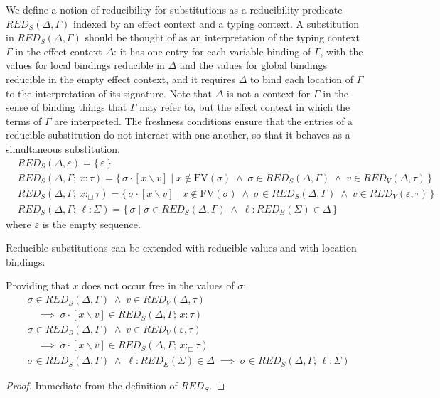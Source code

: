 \documentclass[acmsmall, screen, review, anonymous]{acmart}
\theoremstyle{definition}
\newcommand{\loc}{\ell}
\newcommand{\types}{\mathrel{:}}
\newcommand{\gtypes}{\mathrel{:_{\Box}}}
\newcommand{\cempty}{\varepsilon}
\newcommand{\ccons}[2]{#1;\,#2}
\newcommand{\lbind}[3]{\ccons{#1}{#2\types#3}}
\newcommand{\gbind}[3]{\ccons{#1}{#2\gtypes#3}}
\newcommand{\sub}[2]{[#1\backslash#2]}
\newcommand{\fv}[1]{\mathrm{FV}(#1)}
\newcommand{\redname}{RED}
\newcommand{\redvname}{\redname_{V}}
\newcommand{\redv}[2]{\redvname{({#1},{#2})}}
\newcommand{\redsname}{\redname_{S}}
\newcommand{\reds}[2]{\redsname{({#1},{#2})}}
\newcommand{\redsigname}{\redname_{E}}
\newcommand{\redsig}[1]{\redsigname{(#1)}}
\begin{document}
We define a notion of reducibility for substitutions as a reducibility
predicate $\reds{\Delta}{\Gamma}$ indexed by an effect context and a
typing context. A substitution in $\reds{\Delta}{\Gamma}$ should be
thought of as an interpretation of the typing context $\Gamma$
in the effect context $\Delta$: it has one entry for each variable
binding of $\Gamma$, with the values for local bindings reducible in
$\Delta$ and the values for global bindings reducible in the empty
effect context, and it requires $\Delta$ to bind each location of
$\Gamma$ to the interpretation of its signature. Note that $\Delta$ is
not a context for $\Gamma$ in the sense of binding things that
$\Gamma$ may refer to, but the effect context in which the terms of
$\Gamma$ are interpreted. The freshness conditions ensure that the
entries of a reducible substitution do not interact with one another,
so that it behaves as a simultaneous substitution.
\begin{align*}
  &\reds{\Delta}{\cempty} =
    \{ \, \cempty \, \} \\
  &\reds{\Delta}{\lbind{\Gamma}{x}{\tau}} =
    \{ \, \sigma \cdot \sub{x}{v} \; | \;
       x \notin \fv{\sigma}
       \; \wedge \; \sigma \in \reds{\Delta}{\Gamma}
       \; \wedge \; v \in \redv{\Delta}{\tau} \, \} \\
  &\reds{\Delta}{\gbind{\Gamma}{x}{\tau}} =
    \{ \, \sigma \cdot \sub{x}{v} \; | \;
       x \notin \fv{\sigma}
       \; \wedge \; \sigma \in \reds{\Delta}{\Gamma}
       \; \wedge \; v \in \redv{\cempty}{\tau} \, \} \\
  &\reds{\Delta}{\lbind{\Gamma}{\loc}{\Sigma}} =
    \{ \, \sigma \; | \;
       \sigma \in \reds{\Delta}{\Gamma}
       \; \wedge \; \loc \types \redsig{\Sigma} \in \Delta \, \}
\end{align*}
where $\cempty$ is the empty sequence.

Reducible substitutions can be extended with reducible values and with
location bindings:
\begin{lemma}
\label{lemma:red-subst-extend}
Providing that $x$ does not occur free in the values of $\sigma$:
\begin{align*}
  &\sigma \in \reds{\Delta}{\Gamma}
   \; \wedge \; v \in \redv{\Delta}{\tau} \\
  &\quad \implies \;
   \sigma \cdot \sub{x}{v} \in \reds{\Delta}{\lbind{\Gamma}{x}{\tau}} \\
  &\sigma \in \reds{\Delta}{\Gamma}
   \; \wedge \; v \in \redv{\cempty}{\tau} \\
  &\quad \implies \;
   \sigma \cdot \sub{x}{v} \in \reds{\Delta}{\gbind{\Gamma}{x}{\tau}} \\
  &\sigma \in \reds{\Delta}{\Gamma}
   \; \wedge \; \loc \types \redsig{\Sigma} \in \Delta
   \; \implies \;
   \sigma \in \reds{\Delta}{\lbind{\Gamma}{\loc}{\Sigma}}
\end{align*}
\end{lemma}
\begin{proof}
  Immediate from the definition of $\redsname$.
\end{proof}
\end{document}
